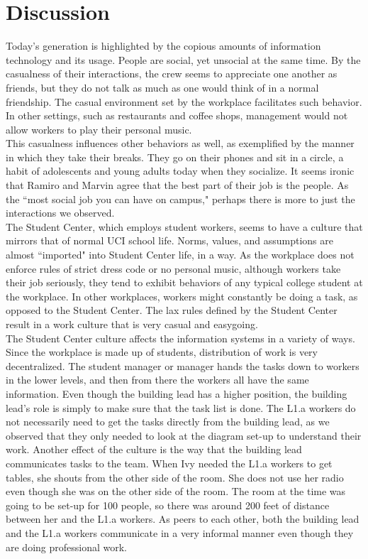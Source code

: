 \documentclass[letterpaper, 12pt]{report}
\begin{document}
\section{Discussion}
Today's generation is highlighted by the copious amounts of information technology and its usage. People are social, yet unsocial at the same time. By the casualness of their interactions, the crew seems to appreciate one another as friends, but they do not talk as much as one would think of in a normal friendship. The casual environment set by the workplace facilitates such behavior. In other settings, such as restaurants and coffee shops, management would not allow workers to play their personal music.\\

This casualness influences other behaviors as well, as exemplified by the manner in which they take their breaks. They go on their phones and sit in a circle, a habit of adolescents and young adults today when they socialize. It seems ironic that Ramiro and Marvin agree that the best part of their job is the people. As the ``most social job you can have on campus," perhaps there is more to just the interactions we observed.\\

The Student Center, which employs student workers, seems to have a culture that mirrors that of normal UCI school life. Norms, values, and assumptions are almost ``imported" into Student Center life, in a way. As the workplace does not enforce rules of strict dress code or no personal music, although workers take their job seriously, they tend to exhibit behaviors of any typical college student at the workplace. In other workplaces, workers might constantly be doing a task, as opposed to the Student Center. The lax rules defined by the Student Center result in a work culture that is very casual and easygoing.\\

The Student Center culture affects the information systems in a variety of ways. Since the workplace is made up of students, distribution of work is very decentralized. The student manager or manager hands the tasks down to workers in the lower levels, and then from there the workers all have the same information. Even though the building lead has a higher position, the building lead's role is simply to make sure that the task list is done. The L1.a workers do not necessarily need to get the tasks directly from the building lead, as we observed that they only needed to look at the diagram set-up to understand their work. Another effect of the culture is the way that the building lead communicates tasks to the team. When Ivy needed the L1.a workers to get tables, she shouts from the other side of the room. She does not use her radio even though she was on the other side of the room. The room at the time was going to be set-up for 100 people, so there was around 200 feet of distance between her and the L1.a workers. As peers to each other, both the building lead and the L1.a workers communicate in a very informal manner even though they are doing professional work.\\
\end{document}
